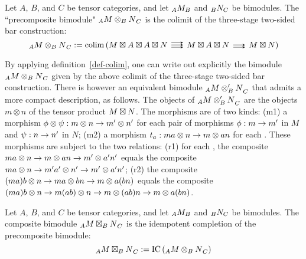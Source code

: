 \documentclass{amsart}
\begin{document}
\begin{definition}
\end{definition}

\begin{definition}
Let $A$, $B$, and $C$ be tensor categories, and let ${}_{A} {M}_{B}$ and ${}_{B} {N}_{C}$ be bimodules.  The ``precomposite bimodule" ${}_{A} {M \otimes_B N}_{C}$ is the colimit of the three-stage two-sided bar construction:
\begin{equation} \nn
\bimod{A}{M \otimes_B N}{C} := \colim \left( M \dtimes A \dtimes A \dtimes N \righttriplearrows M \dtimes A \dtimes N \rightdoublearrows M \dtimes N \right)
\end{equation}
\end{definition}

\begin{remark} 
By applying definition~\ref{def-colim}, one can write out explicitly the bimodule ${}_{A} {M \otimes_B N}_{C}$ given by the above colimit of the three-stage two-sided bar construction.  There is however an equivalent bimodule ${}_{A} {M \otimes_B' N}_{C}$ that admits a more compact description, as follows.  The objects of ${}_{A} {M \otimes_B' N}_{C}$ are the objects $m \otimes n$ of the tensor product $M \boxtimes N$.  The morphisms are of two kinds: (m1) a morphism $\phi \otimes \psi : m \otimes n \rightarrow m' \otimes n'$ for each pair of morphisms $\phi: m \rightarrow m'$ in $M$ and $\psi: n \rightarrow n'$ in $N$; (m2) a morphism $t_a : ma \otimes n \rightarrow m \otimes an$ for each .  These morphisms are subject to the two relations: (r1) for each , the composite $ma \otimes n \rightarrow m \otimes an \rightarrow m' \otimes a' n'$ equals the composite $ma \otimes n \rightarrow m' a' \otimes n' \rightarrow m' \otimes a' n'$; (r2) the composite $(ma)b \otimes n \rightarrow ma \otimes bn \rightarrow m \otimes a(bn)$ equals the composite $(ma)b \otimes n \rightarrow m(ab) \otimes n \rightarrow m \otimes (ab)n \rightarrow m \otimes a(bn)$.
\end{remark} %



\begin{definition}
Let $A$, $B$, and $C$ be tensor categories, and let ${}_{A} {M}_{B}$ and ${}_{B} {N}_{C}$ be bimodules.  The composite bimodule ${}_{A} {M \boxtimes_B N}_{C}$ is the idempotent completion of the precomposite bimodule:
\begin{equation} \nonumber
{}_{A} {M \boxtimes_B N}_{C} := \operatorname{IC} \left( {}_{A} {M \otimes_B N}_{C} \right)
\end{equation}
\end{definition}
\end{document}
